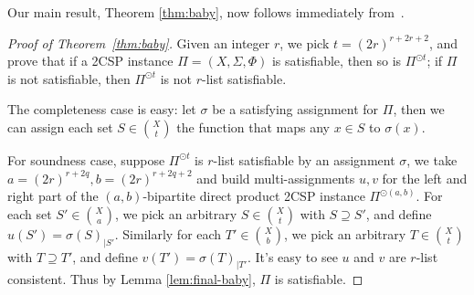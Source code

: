 \noindent
Our main result, Theorem \ref{thm:baby}, now follows immediately from~.

\begin{proof}[Proof of Theorem~\ref{thm:baby}]
    Given an integer $r$, we pick $t=(2r)^{r+2r+2}$, and prove that if a 2CSP instance $\Pi=(X,\Sigma,\Phi)$ is satisfiable, then so is $\Pi^{\odot t}$; if $\Pi$ is not satisfiable, then $\Pi^{\odot t}$ is not $r$-list satisfiable.

    The completeness case is easy: let $\sigma$ be a satisfying assignment for $\Pi$, then we can assign each set $S \in \binom{X}{t}$ the function that maps any $x \in S$ to $\sigma(x)$.

    For soundness case, suppose $\Pi^{\odot t}$ is $r$-list satisfiable by an assignment $\sigma$, we take $a=(2r)^{r+2q}, b=(2r)^{r+2q+2}$ and build multi-assignments $u,v$ for the left and right part of the $(a,b)$-bipartite direct product 2CSP instance $\Pi^{\odot(a,b)}$. For each set $S' \in \binom{X}{a}$, we pick an arbitrary $S \in \binom{X}{t}$ with $S \supseteq S'$, and define $u(S')=\sigma(S)_{|S'}$. Similarly for each $T'\in \binom{X}{b}$, we pick an arbitrary $T \in \binom{X}{t}$ with $T \supseteq T'$, and define $v(T')=\sigma(T)_{|T'}$. It's easy to see $u$ and $v$ are $r$-list consistent. Thus by Lemma \ref{lem:final-baby}, $\Pi$ is satisfiable.
\end{proof}